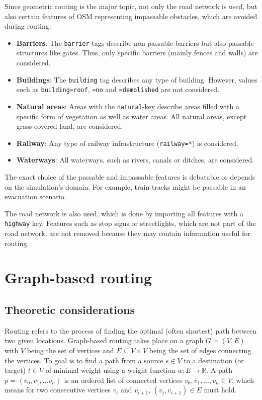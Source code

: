			Since geometric routing is the major topic, not only the road network is used, but also certain features of OSM representing impassable obstacles, which are avoided during routing:
			\begin{itemize}
				\item \textbf{Barriers}: The \texttt{barrier}-tags describe non-passable barriers but also passable structures like gates. Thus, only specific barriers (mainly fences and walls) are considered.
				\item \textbf{Buildings}: The \texttt{building} tag describes any type of building. However, values such as \texttt{building=roof}, \texttt{=no} and \texttt{=demolished} are not considered.
				\item \textbf{Natural areas}: Areas with the \texttt{natural}-key describe areas filled with a specific form of vegetation as well as water areas. All natural areas, except grass-covered land, are considered.
				\item \textbf{Railway}: Any type of railway infrastructure (\texttt{railway=*}) is considered.
				\item \textbf{Waterways}: All waterways, such as rivers, canals or ditches, are considered.
			\end{itemize}
			The exact choice of the passable and impassable features is debatable or depends on the simulation's domain.
			For example, train tracks might be passable in an evacuation scenario.
			
			The road network is also used, which is done by importing all features with a \texttt{highway} key.
			Features such as stop signs or streetlights, which are not part of the road network, are not removed because they may contain information useful for routing.

\section{Graph-based routing}
\label{sec:graph-routing}

	\subsection{Theoretic considerations}
	\label{subsec:routing-theoretic-considerations}	
	
		Routing refers to the process of finding the optimal (often shortest) path between two given locations.
		Graph-based routing takes place on a graph $G=(V, E)$ with $V$ being the set of vertices and $E \subseteq V \times V$ being the set of edges connecting the vertices\cite[643-644]{cormen-introduction-to-alg}.
		To goal is to find a path from a source $s \in V$ to a destination (or target) $t \in V$ of minimal weight using a weight function $w: E \rightarrow \mathbb{R}$.
		A path $p=\left\langle v_0, v_1, \dots v_n \right\rangle$ is an ordered list of connected vertices $v_0, v_1, \dots, v_n \in V$, which means for two consecutive vertices $v_i$ and $v_{i+1}$, $(v_i, v_{i+1}) \in E$ must hold.
		
